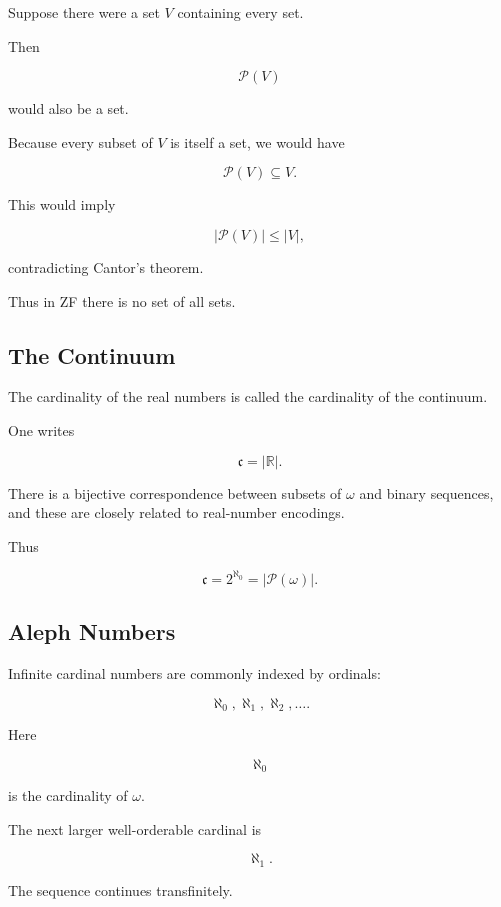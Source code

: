 Suppose there were a set \(V\) containing every set.

Then

\[
\mathcal{P}(V)
\]

would also be a set.

Because every subset of \(V\) is itself a set, we would have

\[
\mathcal{P}(V)
\subseteq
V.
\]

This would imply

\[
|\mathcal{P}(V)|
\leq
|V|,
\]

contradicting Cantor's theorem.

Thus in ZF there is no set of all sets.

\subsection{The Continuum}
\label{subsec:the-continuum}

The cardinality of the real numbers is called the cardinality of the
continuum.

One writes

\[
\boxed{
\mathfrak{c}
=
|\mathbb{R}|.
}
\]

There is a bijective correspondence between subsets of \(\omega\) and
binary sequences, and these are closely related to real-number encodings.

Thus

\[
\boxed{
\mathfrak{c}
=
2^{\aleph_0}
=
|\mathcal{P}(\omega)|.
}
\]

\subsection{Aleph Numbers}
\label{subsec:aleph-numbers}

Infinite cardinal numbers are commonly indexed by ordinals:

\[
\boxed{
\aleph_0,
\aleph_1,
\aleph_2,
\ldots.
}
\]

Here

\[
\aleph_0
\]

is the cardinality of \(\omega\).

The next larger well-orderable cardinal is

\[
\aleph_1.
\]

The sequence continues transfinitely.

